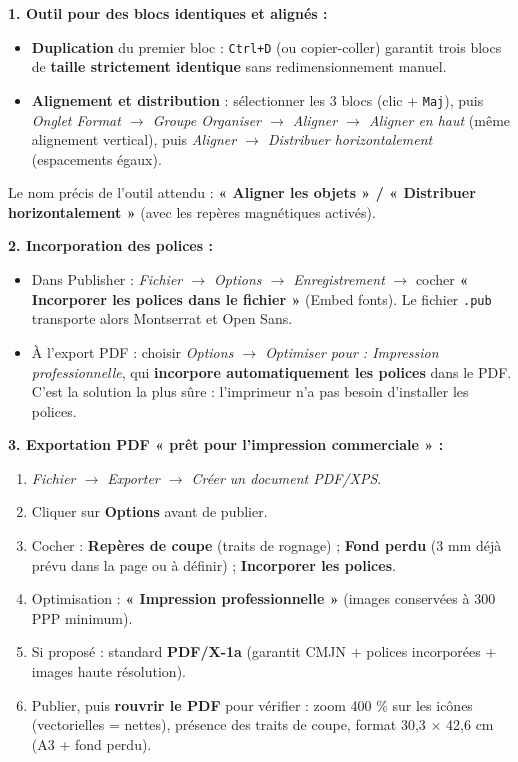 \documentclass[11pt]{article}
\begin{document}
\begin{corrige}
\textbf{1. Outil pour des blocs identiques et alignés :}
\begin{itemize}
    \item \textbf{Duplication} du premier bloc : \texttt{Ctrl+D} (ou copier-coller) garantit trois blocs de \textbf{taille strictement identique} sans redimensionnement manuel.
    \item \textbf{Alignement et distribution} : sélectionner les 3 blocs (clic + \texttt{Maj}), puis \textit{Onglet Format $\rightarrow$ Groupe Organiser $\rightarrow$ Aligner $\rightarrow$ Aligner en haut} (même alignement vertical), puis \textit{Aligner $\rightarrow$ Distribuer horizontalement} (espacements égaux).
\end{itemize}
Le nom précis de l'outil attendu : \textbf{« Aligner les objets » / « Distribuer horizontalement »} (avec les repères magnétiques activés).

\textbf{2. Incorporation des polices :}
\begin{itemize}
    \item Dans Publisher : \textit{Fichier $\rightarrow$ Options $\rightarrow$ Enregistrement} $\rightarrow$ cocher \textbf{« Incorporer les polices dans le fichier »} (Embed fonts). Le fichier \texttt{.pub} transporte alors Montserrat et Open Sans.
    \item À l'export PDF : choisir \textit{Options $\rightarrow$ Optimiser pour : Impression professionnelle}, qui \textbf{incorpore automatiquement les polices} dans le PDF. C'est la solution la plus sûre : l'imprimeur n'a pas besoin d'installer les polices.
\end{itemize}

\textbf{3. Exportation PDF « prêt pour l'impression commerciale » :}
\begin{enumerate}
    \item \textit{Fichier $\rightarrow$ Exporter $\rightarrow$ Créer un document PDF/XPS}.
    \item Cliquer sur \textbf{Options} avant de publier.
    \item Cocher : \textbf{Repères de coupe} (traits de rognage) ; \textbf{Fond perdu} (3 mm déjà prévu dans la page ou à définir) ; \textbf{Incorporer les polices}.
    \item Optimisation : \textbf{« Impression professionnelle »} (images conservées à 300 PPP minimum).
    \item Si proposé : standard \textbf{PDF/X-1a} (garantit CMJN + polices incorporées + images haute résolution).
    \item Publier, puis \textbf{rouvrir le PDF} pour vérifier : zoom 400 \% sur les icônes (vectorielles = nettes), présence des traits de coupe, format 30,3 $\times$ 42,6 cm (A3 + fond perdu).
\end{enumerate}


\end{corrige}
\end{document}
